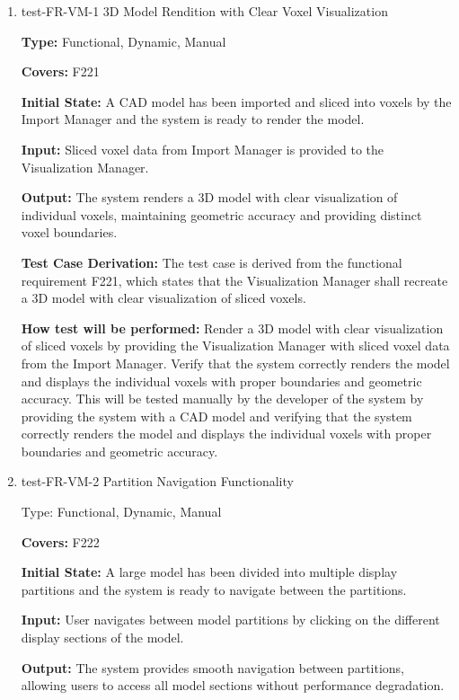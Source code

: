 \documentclass[12pt, titlepage]{article}
\begin{document}
\begin{enumerate}

\item{test-FR-VM-1 3D Model Rendition with Clear Voxel Visualization\\}

\textbf{Type:} Functional, Dynamic, Manual

\textbf{Covers:} F221
					
\textbf{Initial State:} A CAD model has been imported and sliced into voxels by the Import Manager and the system is ready to render the model.
					
\textbf{Input:} Sliced voxel data from Import Manager is provided to the Visualization Manager.
					
\textbf{Output:} The system renders a 3D model with clear visualization of individual voxels, maintaining geometric accuracy and providing distinct voxel boundaries.

\textbf{Test Case Derivation:} The test case is derived from the functional requirement F221, which states that the Visualization Manager shall recreate a 3D model with clear visualization of sliced voxels.
					
\textbf{How test will be performed:} Render a 3D model with clear visualization of sliced voxels by providing the Visualization Manager with sliced voxel data from the Import Manager. Verify that the system correctly renders the model and displays the individual voxels with proper boundaries and geometric accuracy. This will be tested manually by the developer of the system by providing the system with a CAD model and verifying that the system correctly renders the model and displays the individual voxels with proper boundaries and geometric accuracy. 

\item{test-FR-VM-2 Partition Navigation Functionality\\}

Type: Functional, Dynamic, Manual

\textbf{Covers:} F222
					
\textbf{Initial State:} A large model has been divided into multiple display partitions and the system is ready to navigate between the partitions.
					
\textbf{Input:} User navigates between model partitions by clicking on the different display sections of the model.
					
\textbf{Output:} The system provides smooth navigation between partitions, allowing users to access all model sections without performance degradation.


\end{enumerate}
\end{document}
